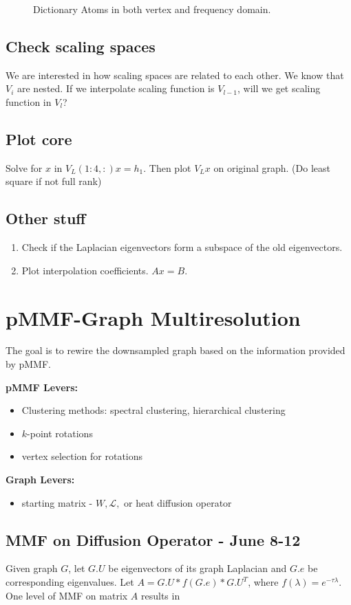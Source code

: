 \documentclass[a4paper]{article}
\newcommand{\La}{\mathcal{L}}
\begin{document}
\begin{figure}[H]
\caption{\label{fig:sensor net} Dictionary Atoms in both vertex and frequency domain.}
\end{figure}

\subsection{Check scaling spaces }
We are interested in how scaling spaces are related to each other. We know that $V_i$ are nested. If we interpolate scaling function is $V_{l-1}$, will we get scaling function in $V_l$?

\subsection{Plot core}

Solve for $x$ in $V_L(1:4,:)x = h_1$. Then plot $V_Lx$ on original graph. (Do least square if not full rank)

\subsection{Other stuff}
\begin{enumerate}
\item Check if the Laplacian eigenvectors form a subspace of the old eigenvectors. 
\item Plot interpolation coefficients. $Ax= B$.
\end{enumerate}

\section{pMMF-Graph Multiresolution}

The goal is to rewire the downsampled graph based on the information provided by pMMF. 

\textbf{pMMF Levers:}
\begin{itemize}
\item Clustering methods: spectral clustering, hierarchical clustering
\item $k$-point rotations
\item vertex selection for rotations
\end{itemize}

\textbf{Graph Levers:}
\begin{itemize}
\item starting matrix - $W, \La,$ or heat diffusion operator
\end{itemize}


\subsection{MMF on Diffusion Operator - June 8-12}
Given graph $G$, let $G.U$ be eigenvectors of its graph Laplacian and $G.e$ be corresponding eigenvalues. Let $A = G.U*f(G.e)*G.U^T$, where $f(\lambda) = e^{-\tau\lambda}$. One level of MMF on matrix $A$ results in
\end{document}
